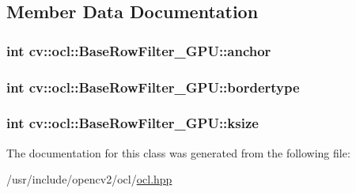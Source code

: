 \subsection{Member Data Documentation}
\hypertarget{classcv_1_1ocl_1_1BaseRowFilter__GPU_afcfa596ca552ed589b1790579ba7430e}{
\subsubsection[{anchor}]{\setlength{\rightskip}{0pt plus 5cm}int cv\-::ocl\-::\-Base\-Row\-Filter\-\_\-\-G\-P\-U\-::anchor}}\label{classcv_1_1ocl_1_1BaseRowFilter__GPU_afcfa596ca552ed589b1790579ba7430e}
\hypertarget{classcv_1_1ocl_1_1BaseRowFilter__GPU_a7ac043fb916dd35d72be54cfbdc2cdcc}{
\subsubsection[{bordertype}]{\setlength{\rightskip}{0pt plus 5cm}int cv\-::ocl\-::\-Base\-Row\-Filter\-\_\-\-G\-P\-U\-::bordertype}}\label{classcv_1_1ocl_1_1BaseRowFilter__GPU_a7ac043fb916dd35d72be54cfbdc2cdcc}
\hypertarget{classcv_1_1ocl_1_1BaseRowFilter__GPU_a517381586af57d704eb40de09bb26dc8}{
\subsubsection[{ksize}]{\setlength{\rightskip}{0pt plus 5cm}int cv\-::ocl\-::\-Base\-Row\-Filter\-\_\-\-G\-P\-U\-::ksize}}\label{classcv_1_1ocl_1_1BaseRowFilter__GPU_a517381586af57d704eb40de09bb26dc8}


The documentation for this class was generated from the following file\-:\begin{DoxyCompactItemize}
\item 
/usr/include/opencv2/ocl/\hyperlink{ocl_2ocl_8hpp}{ocl.\-hpp}\end{DoxyCompactItemize}
